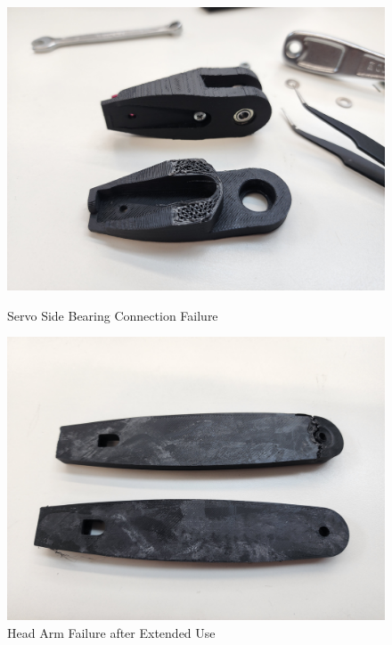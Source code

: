 \begin{figure}[htbp]
    \centering
    \begin{minipage}{0.45\textwidth}
        \centering
        \includegraphics[width=\textwidth]{Images/HeadArmFailure (3).jpg}
        \caption{Servo Side Bearing Connection Failure}
        \label{fig:servo_bearing_failure}
    \end{minipage}
    \hfill
    \begin{minipage}{0.45\textwidth}
        \centering
        \includegraphics[width=\textwidth]{Images/HeadArmFailure.jpg}
        \caption{Head Arm Failure after Extended Use}
        \label{fig:head_arm_failure}
    \end{minipage}
\end{figure}

